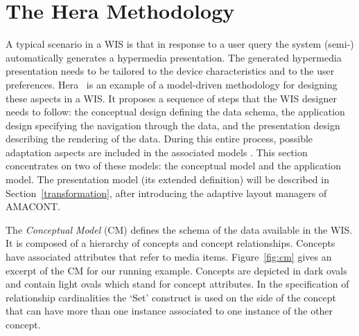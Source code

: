 \documentclass[oribibl]{llncs}
\begin{document}
\section{The Hera Methodology}
\label{hera}

A typical scenario in a WIS is that in response to a user query the system (semi-) automatically generates a hypermedia presentation.
The generated hypermedia presentation needs to be tailored to the device characteristics and to the user preferences. 
Hera~\cite{hera:jwe} is an example of a model-driven methodology for designing these aspects in a WIS.
It proposes a sequence of steps that the WIS designer needs to follow: the conceptual design defining the data schema, the application design specifying the navigation through the data, and the presentation design describing the rendering of the data.
During this entire process, possible adaptation aspects are included
in the associated models \cite{hera:itcc}. 
This section concentrates on two of these models: the conceptual model and the application
model. 
The presentation model (its extended definition) will be described in Section~\ref{transformation}, after
introducing the adaptive layout managers of AMACONT. 


The \emph{Conceptual Model} (CM) defines the schema of the data available in the WIS.
It is composed of a hierarchy of concepts and concept relationships.
Concepts have associated attributes that refer to media items.
Figure~\ref{fig:cm} gives an excerpt of the CM for our running example.
Concepts are depicted in dark ovals and contain light ovals which stand for concept attributes. 
In the specification of relationship cardinalities the `Set' construct is used on the side of the concept
that can have more than one instance associated to one instance of the other concept. 
\end{document}
